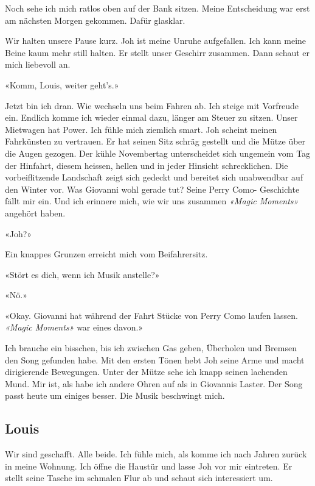 Noch sehe ich mich ratlos oben auf der Bank sitzen. Meine Entscheidung
war erst am nächsten Morgen gekommen. Dafür glasklar.

\sectionbreak

Wir halten unsere Pause kurz. Joh ist meine Unruhe aufgefallen. Ich kann
meine Beine kaum mehr still halten.
Er stellt unser Geschirr zusammen. Dann schaut er mich liebevoll an.

«Komm, Louis, weiter geht’s.»

Jetzt bin ich dran. Wie wechseln uns beim Fahren ab. Ich steige mit
Vorfreude ein. Endlich komme ich wieder einmal dazu, länger am Steuer zu
sitzen. Unser Mietwagen hat Power. Ich fühle mich ziemlich smart.
Joh scheint meinen Fahrkünsten zu vertrauen. Er hat seinen Sitz schräg
gestellt und die Mütze über die Augen gezogen.
Der kühle Novembertag unterscheidet sich ungemein vom Tag der Hinfahrt,
diesem heissen, hellen und in jeder Hinsicht schrecklichen. Die
vorbeiflitzende Landschaft zeigt sich gedeckt und bereitet sich
unabwendbar auf den Winter vor. Was Giovanni wohl gerade tut? Seine
Perry Como- Geschichte fällt mir ein. Und ich erinnere mich, wie wir uns
zusammen \emph{«Magic Moments»} angehört haben.

«Joh?»

Ein knappes Grunzen erreicht mich vom Beifahrersitz.

«Stört es dich, wenn ich Musik anstelle?»

«Nö.»

«Okay. Giovanni hat während der Fahrt Stücke von Perry Como laufen
lassen. \emph{«Magic Moments»} war eines davon.»

Ich brauche ein bisschen, bis ich zwischen Gas geben, Überholen und
Bremsen den Song gefunden habe. Mit den ersten Tönen hebt Joh seine Arme
und macht dirigierende Bewegungen. Unter der Mütze sehe ich knapp seinen
lachenden Mund.
Mir ist, als habe ich andere Ohren auf als in Giovannis Laster. Der Song
passt heute um einiges besser. Die Musik beschwingt mich.


\subsection{Louis}

Wir sind geschafft. Alle beide.
Ich fühle mich, als komme ich nach Jahren zurück in meine Wohnung. Ich
öffne die Haustür und lasse Joh vor mir eintreten. Er stellt seine
Tasche im schmalen Flur ab und schaut sich interessiert um.

